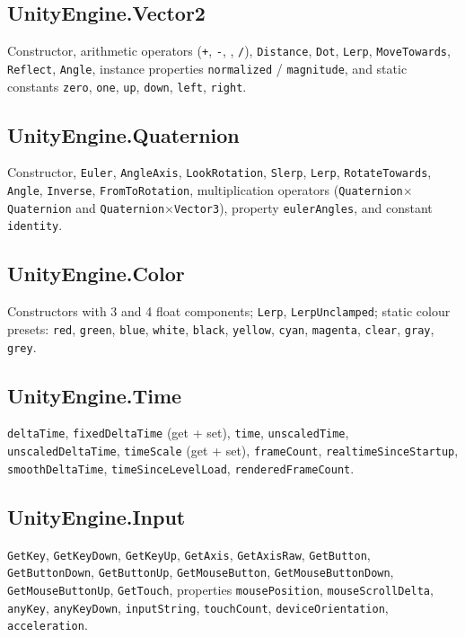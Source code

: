 \documentclass[11pt,a4paper]{article}
\newcommand{\code}[1]{\texttt{\small #1}}
\begin{document}
\subsection{UnityEngine.Vector2}

Constructor, arithmetic operators (\code{+}, \code{-}, \code{*}, \code{/}),
\code{Distance}, \code{Dot}, \code{Lerp}, \code{MoveTowards}, \code{Reflect},
\code{Angle}, instance properties \code{normalized} / \code{magnitude}, and static
constants \code{zero}, \code{one}, \code{up}, \code{down}, \code{left},
\code{right}.

\subsection{UnityEngine.Quaternion}

Constructor, \code{Euler}, \code{AngleAxis}, \code{LookRotation},
\code{Slerp}, \code{Lerp}, \code{RotateTowards}, \code{Angle},
\code{Inverse}, \code{FromToRotation}, multiplication operators
(\code{Quaternion}$\times$\code{Quaternion} and \code{Quaternion}$\times$\code{Vector3}),
property \code{eulerAngles}, and constant \code{identity}.

\subsection{UnityEngine.Color}

Constructors with 3 and 4 float components; \code{Lerp}, \code{LerpUnclamped};
static colour presets: \code{red}, \code{green}, \code{blue}, \code{white},
\code{black}, \code{yellow}, \code{cyan}, \code{magenta}, \code{clear},
\code{gray}, \code{grey}.

\subsection{UnityEngine.Time}

\code{deltaTime}, \code{fixedDeltaTime} (get + set), \code{time},
\code{unscaledTime}, \code{unscaledDeltaTime}, \code{timeScale} (get + set),
\code{frameCount}, \code{realtimeSinceStartup}, \code{smoothDeltaTime},
\code{timeSinceLevelLoad}, \code{renderedFrameCount}.

\subsection{UnityEngine.Input}

\code{GetKey}, \code{GetKeyDown}, \code{GetKeyUp},
\code{GetAxis}, \code{GetAxisRaw},
\code{GetButton}, \code{GetButtonDown}, \code{GetButtonUp},
\code{GetMouseButton}, \code{GetMouseButtonDown}, \code{GetMouseButtonUp},
\code{GetTouch}, properties \code{mousePosition}, \code{mouseScrollDelta},
\code{anyKey}, \code{anyKeyDown}, \code{inputString}, \code{touchCount},
\code{deviceOrientation}, \code{acceleration}.
\end{document}
